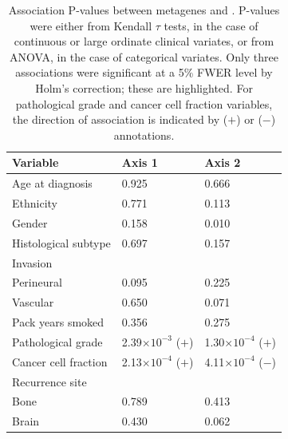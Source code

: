 \documentclass[dissertation.tex]{subfiles}
\begin{document}
\begin{table}
\centering
\caption[Association P-values between metagenes and \texorpdfstring{}{CPVs}]{Association P-values between metagenes and .  P-values were either from Kendall $\tau$ tests, in the case of continuous or large ordinate clinical variates, or from ANOVA, in the case of categorical variates.  Only three associations were significant at a 5\% FWER level by Holm's correction; these are highlighted.  For pathological grade and cancer cell fraction variables, the direction of association is indicated by ($+$) or ($-$) annotations.}\label{tab:sigs-mg-cpvs}
\begin{tabular}{@{}lll@{}}
Variable                   & Axis 1                        & Axis 2                        \\ \midrule
Age at diagnosis           & 0.925                         & 0.666                         \\
Ethnicity                  & 0.771                         & 0.113                         \\
Gender                     & 0.158                         & 0.010                         \\
Histological subtype       & 0.697                         & 0.157                         \\
Invasion                   &                               &                               \\
\quad Perineural           & 0.095                         & 0.225                         \\
\quad Vascular             & 0.650                         & 0.071                         \\
Pack years smoked          & 0.356                         & 0.275                         \\
Pathological grade         & 2.39$\times 10^{-3}$ ($+$)          & \cellcolor[HTML]{C0C0C0}1.30$\times 10^{-4}$ ($+$) \\
Cancer cell fraction       & \cellcolor[HTML]{C0C0C0}2.13$\times 10^{-4}$ ($+$) & \cellcolor[HTML]{C0C0C0}4.11$\times 10^{-4}$ ($-$) \\
Recurrence site            &                               &                               \\
\quad Bone                 & 0.789                         & 0.413                         \\
\quad Brain                & 0.430                         & 0.062                         \\

\end{tabular}
\end{table}
\end{document}

